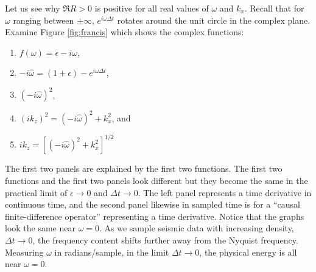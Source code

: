\par
Let us see why $\Re R>0$ is positive
for all real values of $\omega$ and $k_x$.
Recall that for $\omega$ ranging between $\pm\infty$,
$e^{i\omega\Delta t}$ rotates around the unit circle
in the complex plane.
Examine Figure \ref{fig:francis}
which shows the complex functions:
\begin{enumerate}
\item       $f(\omega)= \epsilon - i\omega$,
\item       $ -i\hat\omega = (1+\epsilon) -e^{i\omega\Delta t}$,
\item       $(-i \hat\omega)^2$,
\item       $(ik_z)^2 =(-i \hat\omega)^2+k_x^2$, and
\item       $ik_z = [(-i \hat\omega)^2+k_x^2]^{1/2}$
\end{enumerate}
The first two panels are explained by the first two functions.
The first two functions and the first two panels look different
but they become the same in the practical limit
of $\epsilon\rightarrow 0$ and $\Delta t \rightarrow 0$.
The left panel represents a time derivative in continuous time,
and the second panel likewise
in sampled time is for
a ``causal finite-difference operator''
representing a time derivative.
Notice that the graphs look the same near $\omega = 0$.
As we sample seismic data with increasing density,
$\Delta t \rightarrow 0$,
the frequency content shifts further away from the Nyquist frequency.
Measuring $\omega$ in radians/sample,
in the limit
$\Delta t \rightarrow 0$, the physical energy is all near
$\omega = 0$.


